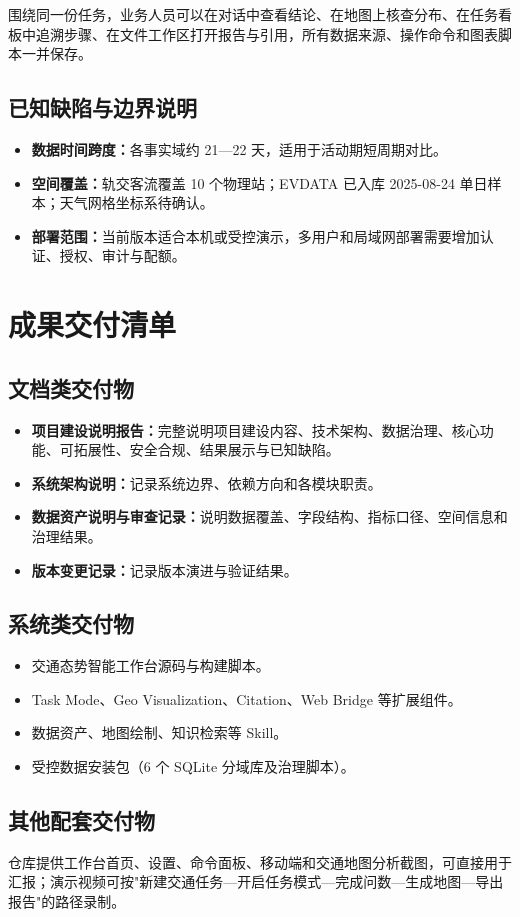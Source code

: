 \documentclass[a4paper,11pt]{article}
\newcommand{\term}[1]{\textbf{#1}}
\begin{document}
围绕同一份任务，业务人员可以在对话中查看结论、在地图上核查分布、在任务看板中追溯步骤、在文件工作区打开报告与引用，所有数据来源、操作命令和图表脚本一并保存。

\subsection{已知缺陷与边界说明}

\begin{itemize}
  \item \term{数据时间跨度：}各事实域约 21—22 天，适用于活动期短周期对比。
  \item \term{空间覆盖：}轨交客流覆盖 10 个物理站；EVDATA 已入库 2025-08-24 单日样本；天气网格坐标系待确认。
  \item \term{部署范围：}当前版本适合本机或受控演示，多用户和局域网部署需要增加认证、授权、审计与配额。
\end{itemize}

\section{成果交付清单}

\subsection{文档类交付物}

\begin{itemize}
  \item \term{项目建设说明报告：}完整说明项目建设内容、技术架构、数据治理、核心功能、可拓展性、安全合规、结果展示与已知缺陷。
  \item \term{系统架构说明：}记录系统边界、依赖方向和各模块职责。
  \item \term{数据资产说明与审查记录：}说明数据覆盖、字段结构、指标口径、空间信息和治理结果。
  \item \term{版本变更记录：}记录版本演进与验证结果。
\end{itemize}

\subsection{系统类交付物}

\begin{itemize}
  \item 交通态势智能工作台源码与构建脚本。
  \item Task Mode、Geo Visualization、Citation、Web Bridge 等扩展组件。
  \item 数据资产、地图绘制、知识检索等 Skill。
  \item 受控数据安装包（6 个 SQLite 分域库及治理脚本）。
\end{itemize}

\subsection{其他配套交付物}

仓库提供工作台首页、设置、命令面板、移动端和交通地图分析截图，可直接用于汇报；演示视频可按"新建交通任务—开启任务模式—完成问数—生成地图—导出报告"的路径录制。
\end{document}
